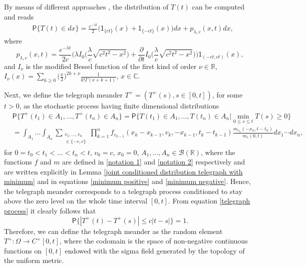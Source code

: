 \documentclass{article}
\theoremstyle{definition}
\numberwithin{equation}{section}
\begin{document}
By means of different approaches \cite{O 1990, DGO 2004}, the distribution of $T(t)$ can be computed and reads
\begin{align}\label{law of telegraph process}&\mathsf{P}\{T(t) \in dx\} = \frac{e^{-\lambda t}}{2}\big(\mathsf{1}_{\{ct\}}(x)+\mathsf{1}_{\{-ct\}}(x)\big)dx+p_{\lambda,c}(x,t)dx, \end{align}
where 
\begin{equation}
p_{\lambda,c}(x,t) = \frac{e^{-\lambda t}}{2c}\Big(\lambda I_0\big(\frac{\lambda}{c}\sqrt{c^2t^2-x^2}\big)+\frac{\partial}{\partial t}I_0\big(\frac{\lambda}{c}\sqrt{c^2t^2-x^2}\big)\Big)\mathsf{1}_{(-ct,ct)}(x),
\end{equation}
and $I_\nu$ is the modified Bessel function of the first kind of order $\nu \in \mathbb{R}$, $I_\nu(x) = \sum_{k\geq 0}\big(\frac{x}{2}\big)^{2k+\nu}\frac{1}{k!\Gamma(\nu +k+1)}$, $x \in \mathbb{C}$. 

Next, we define the telegraph meander $T^+ = (T^+(s),s \in [0,t])$, for some $t>0$, as the stochastic process having finite dimensional distributions
\begin{align}\label{finite dimensional distribution}
&\mathsf{P}\{T^+(t_1)\in A_1,...,T^+(t_n) \in A_n\} =\mathsf{P}\{T(t_1)\in A_1,...,T(t_n) \in A_n|\min_{0\leq s\leq t}T(s)\geq 0\}\nonumber\\
&=\int_{A_1}...\int_{A_n}\sum_{\substack{v_1,...,v_n\\\in \{-c,c\}}}\prod_{k=1}^nf_{v_{k-1}}(x_k-x_{k-1},v_k,-x_{k-1},t_k-t_{k-1})\frac{m_{v_n}(-x_n,t-t_n)}{m_c(0,t)}dx_1 \cdots dx_n, 
\end{align}
for $0=t_0<t_1<...<t_n<t$, $v_0=c$, $x_0=0$, $A_1,..., A_n \in \mathcal{B}(\mathbb{R})$, where the functions $f$ and $m$ are defined in \eqref{notation 1} and \eqref{notation 2} respectively and are written explicitly in Lemma \ref{joint conditioned distribution telegraph with minimum} and in equations \eqref{minimum positive} and \eqref{minimum negative}. Hence, the telegraph meander corresponds to a telegraph process conditioned to stay above the zero level on the whole time interval $[0,t]$. From equation \eqref{telegraph process} it clearly follows that 
\begin{equation}\label{continuity}
\mathsf{P}\{|T^{+}(t)-T^{+}(s)|\leq c|t-s|\}=1.
\end{equation}
Therefore, we can define the telegraph meander as the random element $T^+:\Omega \to C^+[0,t]$, where the codomain is the space of non-negative continuous functions on $[0,t]$ endowed with the sigma field generated by the topology of the uniform metric. 
\end{document}
